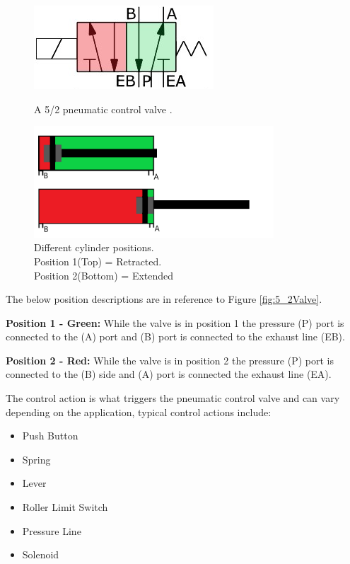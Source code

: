     \begin{figure}[H]
    \centering
    \begin{minipage}{0.45\textwidth}
        \centering
        \includegraphics[scale = 0.5]{2_images/5_2Valve.png}
        \caption{A 5/2 pneumatic control valve \cite{5_2Valves}.}
        \label{fig:5_2Valve}
    \end{minipage}\hfill
    \begin{minipage}{0.5\textwidth}
        \centering
        \includegraphics[width = 0.8\textwidth]{2_images/cylinderAB.png}
        \caption{Different cylinder positions. \\Position 1(Top) = Retracted. \\Position 2(Bottom) = Extended}
        \label{fig:cylinderAB}
    \end{minipage}\hfill            
    \end{figure}          
   
   The below position descriptions are in reference to Figure \ref{fig:5_2Valve}.
    \begin{description}
        \item\textbf{Position 1 - Green:}
        While the valve is in position 1 the pressure (P) port is connected to the (A) port and (B) port is connected to the exhaust line (EB).
        \item\textbf{Position 2 - Red:}
        While the valve is in position 2 the pressure (P) port is connected to the (B) side and (A) port is connected the exhaust line (EA). 
    \end{description}
    
    The control action is what triggers the pneumatic control valve and can vary depending on the application, typical control actions include\cite{parr2011hydraulics}:
    \begin{itemize}
        \item Push Button
        \item Spring
        \item Lever
        \item Roller Limit Switch
        \item Pressure Line
        \item Solenoid
    \end{itemize}
    
